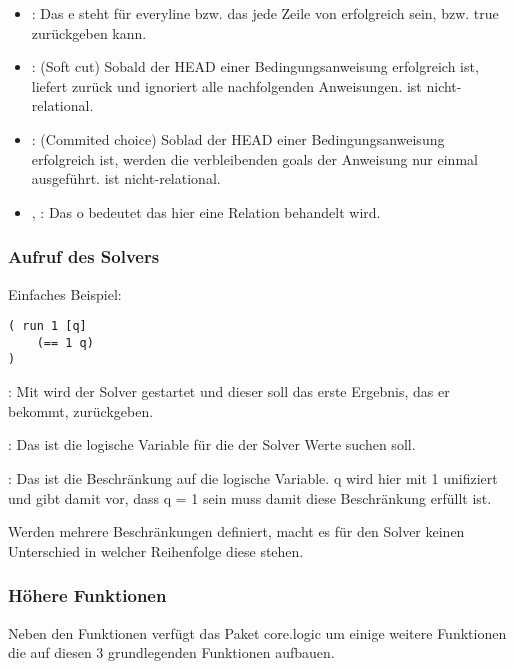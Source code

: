 \begin{itemize}
\item {}:
Das e steht für \dq{}everyline\dq{} bzw. das jede Zeile von  erfolgreich sein, bzw. true zurückgeben kann.

\item {}:
(Soft cut) Sobald der \dq{}HEAD\dq{} einer Bedingungsanweisung erfolgreich ist, liefert   zurück und ignoriert alle nachfolgenden Anweisungen.  ist nicht-relational.

\item {}:
(Commited choice) Soblad der \dq{}HEAD\dq{} einer Bedingungsanweisung erfolgreich ist, werden die verbleibenden \dq{}goals\dq{} der Anweisung nur einmal ausgeführt.  ist nicht-relational.

\item {}, :
Das \dq{}o\dq{} bedeutet das hier eine Relation behandelt wird.
\end{itemize}


\subsubsection{Aufruf des Solvers}

Einfaches Beispiel:

\begin{lstlisting}
( run 1 [q] 
	(== 1 q)
)
\end{lstlisting}
\begin{description}
\item{:}
Mit  wird der Solver gestartet und dieser soll das erste Ergebnis, das er bekommt, zurückgeben.
\item{\code{[q]}:}
Das ist die logische Variable für die der Solver Werte suchen soll.
\item{:}
Das ist die Beschränkung auf die logische Variable. q wird hier mit 1 unifiziert und gibt damit vor, dass q = 1 sein muss damit diese Beschränkung erfüllt ist.
\end{description}
Werden mehrere Beschränkungen definiert, macht es für den Solver keinen Unterschied in welcher Reihenfolge diese stehen. 

\subsubsection{Höhere Funktionen}

Neben den Funktionen  verfügt das Paket core.logic um einige weitere Funktionen die auf diesen 3 grundlegenden Funktionen aufbauen.

